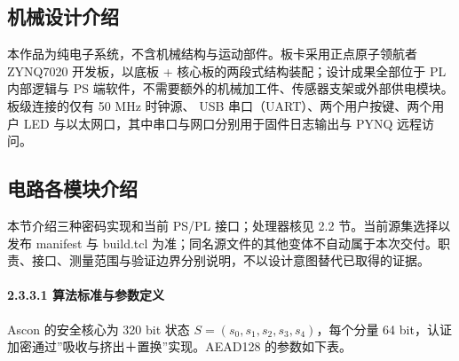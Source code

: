 
\Needspace{85pt}

\subsection{机械设计介绍}

本作品为纯电子系统，不含机械结构与运动部件。板卡采用正点原子领航者 ZYNQ7020 开发板，以底板 + 核心板的两段式结构装配；设计成果全部位于 PL 内部逻辑与 PS 端软件，不需要额外的机械加工件、传感器支架或外部供电模块。板级连接的仅有 50 MHz 时钟源、 USB 串口（UART）、两个用户按键、两个用户 LED 与以太网口，其中串口与网口分别用于固件日志输出与 PYNQ 远程访问。

\Needspace{85pt}

\subsection{电路各模块介绍}

本节介绍三种密码实现和当前 PS/PL 接口；处理器核见 2.2 节。当前源集选择以发布 manifest 与 build.tcl 为准；同名源文件的其他变体不自动属于本次交付。职责、接口、测量范围与验证边界分别说明，不以设计意图替代已取得的证据。

\Needspace{85pt}

\paragraph{2.3.3.1 算法标准与参数定义}

Ascon 的安全核心为 320 bit 状态 \(S=(s_0,s_1,s_2,s_3,s_4)\)，每个分量 64 bit，认证加密通过''吸收与挤出＋置换''实现。AEAD128 的参数如下表。

